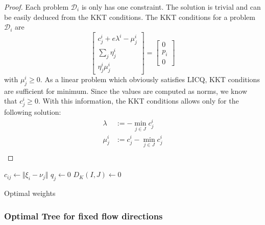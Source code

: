 \begin{proof}
Each problem $\mathcal{D}_i$ is only has one constraint. The solution is trivial and can be easily deduced from the KKT conditions. The KKT conditions for a problem $\mathcal{D}_i$ are
\begin{equation}
  \label{eq:D-i-KKT-in-optimalweightsproof}
  \left[
  \begin{array}{c}
  c_j^i + e\lambda^i -\mu_j^i\\
  \sum_{j}\eta_j^i\\
  \eta_j^i\mu_j^i
  \end{array}
  \right]
  = \left[
    \begin{array}{c}
      0\\p_i\\0
    \end{array}
\right]
\end{equation}
with $\mu_j^i\geq 0$. As a linear problem which obviously satisfies LICQ, KKT conditions are sufficient for minimum. Since the values are computed as norms, we know that $c_j^i\geq 0$. With this information, the KKT conditions allows only for the following solution:
\begin{align}
  \label{eq:optimal-eta-optmimalweightsproof}
  \lambda &:= -\min\limits_{j\in J}c_j^i\\
  \mu_j^i &:= c_j^i - \min\limits_{j\in J}c_j^i\\
\end{align}
\end{proof}
\begin{algorithm}
  $c_{ij} \leftarrow \Vert \xi_i - \nu_j\Vert$
  $q_j \leftarrow 0$\;
  $D_K(I,J) \leftarrow 0$\;
  \caption{Optimal weights}
  \label{alg:optimal-weights}
\end{algorithm}
\subsubsection{Optimal Tree for fixed flow directions}
